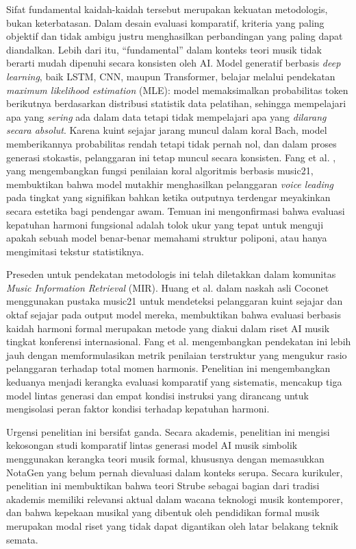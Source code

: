 Sifat fundamental kaidah-kaidah tersebut merupakan kekuatan metodologis, bukan keterbatasan. Dalam desain evaluasi komparatif, kriteria yang paling objektif dan tidak ambigu justru menghasilkan perbandingan yang paling dapat diandalkan. Lebih dari itu, ``fundamental'' dalam konteks teori musik tidak berarti mudah dipenuhi secara konsisten oleh AI. Model generatif berbasis \textit{deep learning}, baik LSTM, CNN, maupun Transformer, belajar melalui pendekatan \textit{maximum likelihood estimation} (MLE): model memaksimalkan probabilitas token berikutnya berdasarkan distribusi statistik data pelatihan, sehingga mempelajari apa yang \textit{sering} ada dalam data tetapi tidak mempelajari apa yang \textit{dilarang secara absolut}. Karena kuint sejajar jarang muncul dalam koral Bach, model memberikannya probabilitas rendah tetapi tidak pernah nol, dan dalam proses generasi stokastis, pelanggaran ini tetap muncul secara konsisten. Fang et al. \parencite{fang2020}, yang mengembangkan fungsi penilaian koral algoritmis berbasis music21, membuktikan bahwa model mutakhir menghasilkan pelanggaran \textit{voice leading} pada tingkat yang signifikan bahkan ketika outputnya terdengar meyakinkan secara estetika bagi pendengar awam. Temuan ini mengonfirmasi bahwa evaluasi kepatuhan harmoni fungsional adalah tolok ukur yang tepat untuk menguji apakah sebuah model benar-benar memahami struktur poliponi, atau hanya mengimitasi tekstur statistiknya.

Preseden untuk pendekatan metodologis ini telah diletakkan dalam komunitas \textit{Music Information Retrieval} (MIR). Huang et al. \parencite{huang2017} dalam naskah asli Coconet menggunakan pustaka music21 untuk mendeteksi pelanggaran kuint sejajar dan oktaf sejajar pada output model mereka, membuktikan bahwa evaluasi berbasis kaidah harmoni formal merupakan metode yang diakui dalam riset AI musik tingkat konferensi internasional. Fang et al. \parencite{fang2020} mengembangkan pendekatan ini lebih jauh dengan memformulasikan metrik penilaian terstruktur yang mengukur rasio pelanggaran terhadap total momen harmonis. Penelitian ini mengembangkan keduanya menjadi kerangka evaluasi komparatif yang sistematis, mencakup tiga model lintas generasi dan empat kondisi instruksi yang dirancang untuk mengisolasi peran faktor kondisi terhadap kepatuhan harmoni.

Urgensi penelitian ini bersifat ganda. Secara akademis, penelitian ini mengisi kekosongan studi komparatif lintas generasi model AI musik simbolik menggunakan kerangka teori musik formal, khususnya dengan memasukkan NotaGen \parencite{wang2025} yang belum pernah dievaluasi dalam konteks serupa. Secara kurikuler, penelitian ini membuktikan bahwa teori Strube sebagai bagian dari tradisi akademis \institutionname{} memiliki relevansi aktual dalam wacana teknologi musik kontemporer, dan bahwa kepekaan musikal yang dibentuk oleh pendidikan formal musik merupakan modal riset yang tidak dapat digantikan oleh latar belakang teknik semata.

